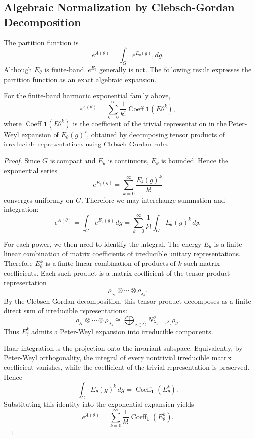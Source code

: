 \documentclass{ssl}
\begin{document}
\subsection{Algebraic Normalization by Clebsch-Gordan Decomposition}

The partition function is
$$
e^{A(\theta)}
=
\int_G e^{E_\theta(g)},dg.
$$
Although $E_\theta$ is finite-band, $e^{E_\theta}$ generally is not. The following result expresses the partition function as an exact algebraic expansion.

\begin{theorem}
For the finite-band harmonic exponential family above,
$$
e^{A(\theta)}
=
\sum_{k=0}^{\infty}
\frac{1}{k!}
\operatorname{Coeff}{\mathbf 1}
\left(E\theta^k\right),
$$
where $\operatorname{Coeff}{\mathbf 1}(E\theta^k)$ is the coefficient of the trivial representation in the Peter-Weyl expansion of $E_\theta(g)^k$, obtained by decomposing tensor products of irreducible representations using Clebsch-Gordan rules.
\end{theorem}

\begin{proof}
Since \(G\) is compact and \(E_\theta\) is continuous, \(E_\theta\) is bounded.
Hence the exponential series
\[
e^{E_\theta(g)}
=
\sum_{k=0}^{\infty}
\frac{E_\theta(g)^k}{k!}
\]
converges uniformly on \(G\). Therefore we may interchange summation and
integration:
\[
e^{A(\theta)}
=
\int_G e^{E_\theta(g)}\,dg
=
\sum_{k=0}^{\infty}
\frac{1}{k!}
\int_G E_\theta(g)^k\,dg.
\]

For each power, we then need to identify the integral. The energy \(E_\theta\) is a
finite linear combination of matrix coefficients of irreducible unitary
representations. Therefore \(E_\theta^k\) is a finite linear combination of
products of \(k\) such matrix coefficients. Each such product is a matrix
coefficient of the tensor-product representation
\[
\rho_{\lambda_1}\otimes\cdots\otimes\rho_{\lambda_k}.
\]
By the Clebsch-Gordan decomposition, this tensor product decomposes as a
finite direct sum of irreducible representations:
\[
\rho_{\lambda_1}\otimes\cdots\otimes\rho_{\lambda_k}
\cong
\bigoplus_{\nu\in\widehat G}
N_{\lambda_1,\dots,\lambda_k}^{\nu}\rho_\nu.
\]
Thus \(E_\theta^k\) admits a Peter-Weyl expansion into irreducible components.

Haar integration is the projection onto the invariant subspace. Equivalently,
by Peter-Weyl orthogonality, the integral of every nontrivial irreducible
matrix coefficient vanishes, while the coefficient of the trivial
representation is preserved. Hence
\[
\int_G E_\theta(g)^k\,dg
=
\operatorname{Coeff}_{\mathbf 1}(E_\theta^k).
\]
Substituting this identity into the exponential expansion yields
\[
e^{A(\theta)}
=
\sum_{k=0}^{\infty}
\frac{1}{k!}
\operatorname{Coeff}_{\mathbf 1}(E_\theta^k).
\]
\end{proof}
\end{document}
